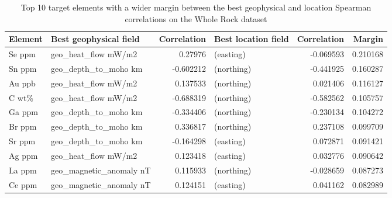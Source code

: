 \begin{table}[H]
\centering
\begin{tabular}{l l r l r r}
\hline
\textbf{Element} & \textbf{Best geophysical field} & \textbf{ Correlation} & \textbf{Best location field} & \textbf{Correlation} & \textbf{Margin}  \\
\hline
Se ppm   & geo\_heat\_flow mW/m2   & 0.27976   & (easting)  & -0.069593 & 0.210168 \\
Sn ppm   & geo\_depth\_to\_moho km & -0.602212 & (northing) & -0.441925 & 0.160287 \\
Au ppb   & geo\_heat\_flow mW/m2   & 0.137533  & (northing) & 0.021406  & 0.116127 \\
C wt\%   & geo\_heat\_flow mW/m2   & -0.688319 & (northing) & -0.582562 & 0.105757 \\
Ga ppm   & geo\_depth\_to\_moho km & -0.334406 & (northing) & -0.230134 & 0.104272 \\
Br ppm   & geo\_depth\_to\_moho km & 0.336817  & (northing) & 0.237108  & 0.099709 \\
Sr ppm   & geo\_depth\_to\_moho km & -0.164298 & (easting)  & 0.072871  & 0.091421 \\
Ag ppm   & geo\_heat\_flow mW/m2   & 0.123418  & (easting)  & 0.032776  & 0.090642 \\
La ppm	& geo\_magnetic\_anomaly nT &	0.115933 &	(northing) &	-0.028659	& 0.087273 \\
Ce ppm &	geo\_magnetic\_anomaly nT &	0.124151 &	(easting) &	0.041162 &	0.082989 \\
\hline
\end{tabular}
\caption{Top 10 target elements with a wider margin between the best geophysical and location Spearman correlations on the Whole Rock dataset}
\label{tab:geophysics-wholerock}
\end{table}


